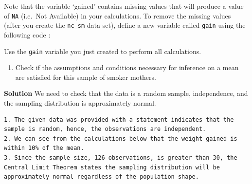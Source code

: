 \documentclass[
]{article}
\newenvironment{Shaded}{\begin{snugshade}}{\end{snugshade}}
\newcommand{\AttributeTok}[1]{\textcolor[rgb]{0.13,0.29,0.53}{#1}}
\newcommand{\ConstantTok}[1]{\textcolor[rgb]{0.56,0.35,0.01}{#1}}
\newcommand{\DecValTok}[1]{\textcolor[rgb]{0.00,0.00,0.81}{#1}}
\newcommand{\FunctionTok}[1]{\textcolor[rgb]{0.13,0.29,0.53}{\textbf{#1}}}
\newcommand{\NormalTok}[1]{#1}
\newcommand{\OtherTok}[1]{\textcolor[rgb]{0.56,0.35,0.01}{#1}}
\newcommand{\SpecialCharTok}[1]{\textcolor[rgb]{0.81,0.36,0.00}{\textbf{#1}}}
\newcommand{\StringTok}[1]{\textcolor[rgb]{0.31,0.60,0.02}{#1}}
\providecommand{\tightlist}{%
  \setlength{\itemsep}{0pt}\setlength{\parskip}{0pt}}
\begin{document}
Note that the variable `gained' contains missing values that will
produce a value of \texttt{NA} (i.e.~Not Available) in your
calculations. To remove the missing values (after you create the
\texttt{nc\_sm} data set), define a new variable called \texttt{gain}
using the following code :

\vspace{3mm}

\begin{Shaded}
\end{Shaded}

Use the \texttt{gain} variable you just created to perform all
calculations.

\begin{enumerate}
\def\labelenumi{\arabic{enumi}.}
\setcounter{enumi}{1}
\tightlist
\item
  Check if the assumptions and conditions necessary for inference on a
  mean are satisfied for this sample of smoker mothers.
\end{enumerate}

\textbf{Solution} We need to check that the data is a random sample,
independence, and the sampling distribution is approximately normal.

\begin{verbatim}
1. The given data was provided with a statement indicates that the sample is random, hence, the observations are independent.
2. We can see from the calculations below that the weight gained is within 10% of the mean. 
3. Since the sample size, 126 observations, is greater than 30, the Central Limit Theorem states the sampling distribution will be approximately normal regardless of the population shape. 
\end{verbatim}

\begin{Shaded}
\end{Shaded}
\end{document}
